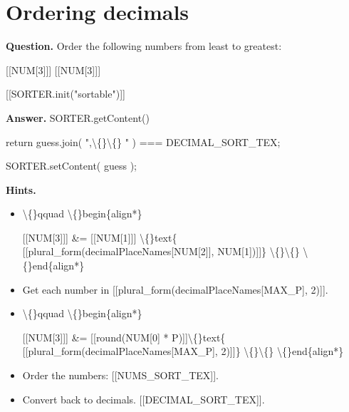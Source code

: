 \documentclass{article}
\begin{document}
\section*{Ordering decimals}
\textbf{Question.} Order the following numbers from least to greatest:
                    
                        
                            [[NUM[3]]]
                            [[NUM[3]]]
                        
                    
                    [[SORTER.init("sortable")]]

\textbf{Answer.} SORTER.getContent()
                    
                        return guess.join( ",\textbackslash\{\}\textbackslash\{\} " ) === DECIMAL\_SORT\_TEX;
                    
                    
                        SORTER.setContent( guess );

\textbf{Hints.}
\begin{itemize}
  \item \textbackslash\{\}qquad \textbackslash\{\}begin\{align*\}
                        
                            [[NUM[3]]] \&= [[NUM[1]]] \textbackslash\{\}text\{ [[plural\_form(decimalPlaceNames[NUM[2]], NUM[1])]]\} \textbackslash\{\}\textbackslash\{\}
                    \textbackslash\{\}end\{align*\}
  \item Get each number in [[plural\_form(decimalPlaceNames[MAX\_P], 2)]].
  \item \textbackslash\{\}qquad \textbackslash\{\}begin\{align*\}
                        
                            [[NUM[3]]] \&= [[round(NUM[0] * P)]]\textbackslash\{\}text\{ [[plural\_form(decimalPlaceNames[MAX\_P], 2)]]\} \textbackslash\{\}\textbackslash\{\}
                    \textbackslash\{\}end\{align*\}
  \item Order the numbers: [[NUMS\_SORT\_TEX]].
  \item Convert back to decimals.
                        [[DECIMAL\_SORT\_TEX]].
\end{itemize}
\end{document}
